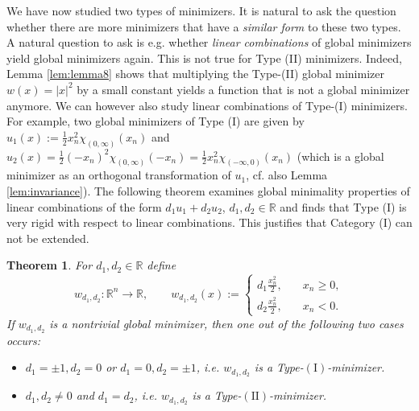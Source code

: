 \documentclass[twoside,11pt]{article}
\newtheorem{theorem}{Theorem}
\theoremstyle{definition}
\begin{document}
We have now studied two types of minimizers. It is natural to ask the question whether there are more minimizers that have a \emph{similar form} to these two types. A natural question to ask is e.g. whether \emph{linear combinations} of global minimizers yield global minimizers again. This is not true for Type (II) minimizers. Indeed, Lemma \ref{lem:lemma8} shows that multiplying the Type-(II) global minimizer $w(x)= |x|^2$ by a small constant yields a function that is not a global minimizer anymore. We can however also study linear combinations of Type-(I) minimizers.
For example, two global minimizers of Type (I) are given by $u_1(x) := \frac{1}{2} x_n^2 \chi_{(0,\infty)}(x_n)$ and $u_2(x) = \frac{1}{2}(-x_n)^2 \chi_{(0,\infty)}(-x_n)= \frac{1}{2}x_n^2 \chi_{(-\infty,0)}(x_n)$ (which is a global minimizer as an orthogonal transformation of $u_1$, cf. also Lemma \ref{lem:invariance}). The following theorem examines global minimality properties of linear combinations of the form $d_1u_1+d_2u_2$, $d_1,d_2 \in \mathbb{R}$ and finds that Type (I) is very rigid with respect to linear combinations. This justifies that Category (I) can not be extended.  
\begin{theorem} \label{theorem:classification_global_min}
    For $d_1,d_2 \in \mathbb{R}$ define 
    \begin{equation}\label{eq:18}
        w_{d_1,d_2} : \mathbb{R}^n \rightarrow \mathbb{R}, \qquad w_{d_1,d_2}(x) := \begin{cases}
            d_1 \frac{x_n^2}{2},\quad & x_n \geq  0, \\ d_2 \frac{x_n^2}{2}, & x_n < 0. 
        \end{cases}  
    \end{equation}
    If $w_{d_1,d_2}$ is a nontrivial global minimizer, then one out of the following two cases occurs: 
    \begin{itemize}
        \item[$\mathrm{(I)}$] $d_1 = \pm 1, d_2 = 0$ or $d_1= 0,d_2 = \pm 1$, i.e. $w_{d_1,d_2}$ is a  Type-$\mathrm{(I)}$-minimizer.
        \item[$\mathrm{(II)}$] $d_1,d_2 \neq 0$ and $d_1 = d_2$, i.e. $w_{d_1,d_2}$ is a Type-$\mathrm{(II)}$-minimizer.
    \end{itemize}
\end{theorem}
\end{document}

